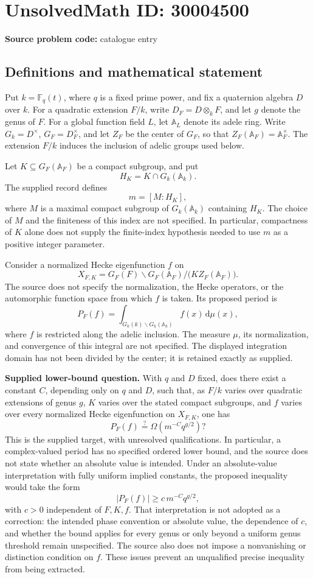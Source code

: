 \documentclass[11pt]{article}
\begin{document}
\section*{UnsolvedMath ID: 30004500}
\textbf{Source problem code:} catalogue entry
\subsection{Definitions and mathematical statement}
Put \(k=\mathbb F_q(t)\), where \(q\) is a fixed prime power, and fix a quaternion algebra \(D\) over \(k\). For a quadratic extension \(F/k\), write \(D_F=D\otimes_k F\), and let \(g\) denote the genus of \(F\). For a global function field \(L\), let \(\mathbb A_L\) denote its adele ring. Write \(G_k=D^\times\), \(G_F=D_F^\times\), and let \(Z_F\) be the center of \(G_F\), so that \(Z_F(\mathbb A_F)=\mathbb A_F^\times\). The extension \(F/k\) induces the inclusion of adelic groups used below.

Let \(K\subseteq G_F(\mathbb A_F)\) be a compact subgroup, and put
\[
H_K=K\cap G_k(\mathbb A_k).
\]
The supplied record defines
\[
m=[M:H_K],
\]
where \(M\) is a maximal compact subgroup of \(G_k(\mathbb A_k)\) containing \(H_K\). The choice of \(M\) and the finiteness of this index are not specified. In particular, compactness of \(K\) alone does not supply the finite-index hypothesis needed to use \(m\) as a positive integer parameter.

Consider a normalized Hecke eigenfunction \(f\) on
\[
X_{F,K}=G_F(F)\backslash G_F(\mathbb A_F)\big/\bigl(KZ_F(\mathbb A_F)\bigr).
\]
The source does not specify the normalization, the Hecke operators, or the automorphic function space from which \(f\) is taken. Its proposed period is
\[
P_F(f)=\int_{G_k(k)\backslash G_k(\mathbb A_k)}f(x)\,\mathrm d\mu(x),
\]
where \(f\) is restricted along the adelic inclusion. The measure \(\mu\), its normalization, and convergence of this integral are not specified. The displayed integration domain has not been divided by the center; it is retained exactly as supplied.

\textbf{Supplied lower-bound question.} With \(q\) and \(D\) fixed, does there exist a constant \(C\), depending only on \(q\) and \(D\), such that, as \(F/k\) varies over quadratic extensions of genus \(g\), \(K\) varies over the stated compact subgroups, and \(f\) varies over every normalized Hecke eigenfunction on \(X_{F,K}\), one has
\[
P_F(f)\stackrel{?}{=}\Omega\!\left(m^{-C}q^{g/2}\right)?
\]
This is the supplied target, with unresolved qualifications. In particular, a complex-valued period has no specified ordered lower bound, and the source does not state whether an absolute value is intended. Under an absolute-value interpretation with fully uniform implied constants, the proposed inequality would take the form
\[
|P_F(f)|\ge c\,m^{-C}q^{g/2},
\]
with \(c>0\) independent of \(F,K,f\). That interpretation is not adopted as a correction: the intended phase convention or absolute value, the dependence of \(c\), and whether the bound applies for every genus or only beyond a uniform genus threshold remain unspecified. The source also does not impose a nonvanishing or distinction condition on \(f\). These issues prevent an unqualified precise inequality from being extracted.
\end{document}
